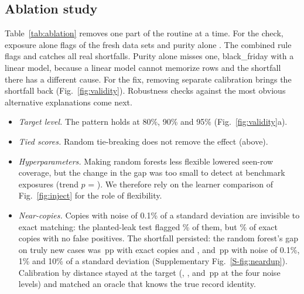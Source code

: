 \subsection{Ablation study}\label{sec:res-ablation}
Table~\ref{tab:ablation} removes one part of the routine at a time. For the check, exposure alone flags \NAblExpoFlag{} of the \NAblNds{} fresh data sets and purity alone \NAblPureFlag{}. The combined rule flags \NAblCombFlag{} and catches all \NAblNpos{} real shortfalls. Purity alone misses one, black\_friday with a linear model, because a linear model cannot memorize rows and the shortfall there has a different cause. For the fix, removing separate calibration brings the shortfall back (Fig.~\ref{fig:validity}). Robustness checks against the most obvious alternative explanations come next.
\begin{itemize}
\item \emph{Target level.} The pattern holds at 80\%, 90\% and 95\% (Fig.~\ref{fig:validity}a).
\item \emph{Tied scores.} Random tie-breaking does not remove the effect (above).
\item \emph{Hyperparameters.} Making random forests less flexible lowered seen-row coverage, but the change in the gap was too small to detect at benchmark exposures (trend $p$ = \NCapClassificationRfP{}). We therefore rely on the learner comparison of Fig.~\ref{fig:inject} for the role of flexibility.
\item \emph{Near-copies.} Copies with noise of 0.1\% of a standard deviation are invisible to exact matching: the planted-leak test flagged \NLeakJitterRecall{}\% of them, but \NLeakRecall{}\% of \NLeakPlanted{} exact copies with no false positives. The shortfall persisted: the random forest's gap on truly new cases was \NNdClaZeropZeroSCP{}\,pp with exact copies and \NNdClaZeropZeroZeroOneSCP{}, \NNdClaZeropZeroOneSCP{} and \NNdClaZeropOneSCP{}\,pp with noise of 0.1\%, 1\% and 10\% of a standard deviation (Supplementary Fig.~\ref{S-fig:neardup}). Calibration by distance stayed at the target (\NNdClaZeropZeroDCP{}, \NNdClaZeropZeroZeroOneDCP{}, \NNdClaZeropZeroOneDCP{} and \NNdClaZeropOneDCP{}\,pp at the four noise levels) and matched an oracle that knows the true record identity.
\end{itemize}

